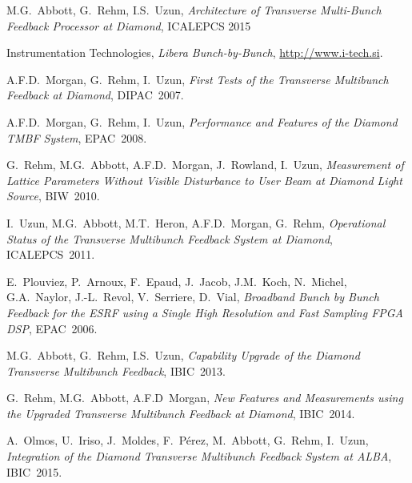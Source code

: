 \documentclass[a4paper]{jacow}
\begin{document}
\begin{thebibliography}{99}

M.G.~Abbott, G.~Rehm, I.S.~Uzun,
\emph{Architecture of Transverse Multi-Bunch Feedback Processor at Diamond},
ICALEPCS 2015

Instrumentation Technologies, \emph{Libera Bunch-by-Bunch},
\url{http://www.i-tech.si}.

A.F.D.~Morgan, G.~Rehm, I.~Uzun, \emph{First Tests of the Transverse Multibunch
Feedback at Diamond}, DIPAC~2007.

A.F.D.~Morgan, G.~Rehm, I.~Uzun, \emph{Performance and Features of the Diamond
TMBF System}, EPAC~2008.

G.~Rehm, M.G.~Abbott, A.F.D.~Morgan, J.~Rowland, I.~Uzun, \emph{Measurement of
Lattice Parameters Without Visible Disturbance to User Beam at Diamond Light
Source}, BIW~2010.

I.~Uzun, M.G.~Abbott, M.T.~Heron, A.F.D.~Morgan, G.~Rehm, \emph{Operational
Status of the Transverse Multibunch Feedback System at Diamond}, ICALEPCS~2011.

E.~Plouviez, P.~Arnoux, F.~Epaud, J.~Jacob, J.M.~Koch, N.~Michel, G.A.~Naylor,
J.\mbox{-}L.~Revol, V.~Serriere, D.~Vial, \emph{Broadband Bunch by Bunch
Feedback for the ESRF using a Single High Resolution and Fast Sampling FPGA
DSP}, EPAC~2006.

M.G.~Abbott, G.~Rehm, I.S.~Uzun, \emph{Capability Upgrade of the Diamond
Transverse Multibunch Feedback}, IBIC~2013.

G.~Rehm, M.G.~Abbott, A.F.D~Morgan, \emph{New Features and Measurements using
the Upgraded Transverse Multibunch Feedback at Diamond}, IBIC~2014.

A.~Olmos, U.~Iriso, J.~Moldes, F.~P\'erez, M.~Abbott, G.~Rehm, I.~Uzun,
\emph{Integration of the Diamond Transverse Multibunch Feedback System at ALBA},
IBIC~2015.

\vspace{0pt}

\end{thebibliography}
\end{document}
